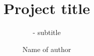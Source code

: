 \title{Project title}
\subtitle{- subtitle}
\author{Name of author}
\subject{Computer Science}
\createtitlepage